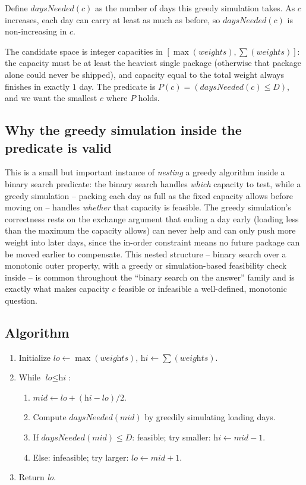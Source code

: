 Define $\textit{daysNeeded}(c)$ as the number of days this greedy
simulation takes. As $c$ increases, each day can carry at least as much as
before, so $\textit{daysNeeded}(c)$ is non-increasing in $c$.

\begin{ideabox}
The candidate space is integer capacities in
$[\max(\textit{weights}), \sum(\textit{weights})]$: the capacity must be
at least the heaviest single package (otherwise that package alone could
never be shipped), and capacity equal to the total weight always finishes
in exactly $1$ day. The predicate is
$P(c) = (\textit{daysNeeded}(c) \le D)$, and we want the smallest $c$
where $P$ holds.
\end{ideabox}

\subsection*{Why the greedy simulation inside the predicate is valid}

This is a small but important instance of \emph{nesting} a greedy
algorithm inside a binary search predicate: the binary search handles
\emph{which} capacity to test, while a greedy simulation -- packing each
day as full as the fixed capacity allows before moving on -- handles
\emph{whether} that capacity is feasible. The greedy simulation's
correctness rests on the exchange argument that ending a day early
(loading less than the maximum the capacity allows) can never help and can
only push more weight into later days, since the in-order constraint means
no future package can be moved earlier to compensate. This nested
structure -- binary search over a monotonic outer property, with a greedy
or simulation-based feasibility check inside -- is common throughout the
``binary search on the answer'' family and is exactly what makes capacity
$c$ feasible or infeasible a well-defined, monotonic question.

\subsection*{Algorithm}

\begin{enumerate}
  \item Initialize $\textit{lo} \gets \max(\textit{weights})$,
        $\textit{hi} \gets \sum(\textit{weights})$.
  \item While $\textit{lo} \le \textit{hi}$:
  \begin{enumerate}
    \item $\textit{mid} \gets \textit{lo}+(\textit{hi}-\textit{lo})/2$.
    \item Compute $\textit{daysNeeded}(\textit{mid})$ by greedily
          simulating loading days.
    \item If $\textit{daysNeeded}(\textit{mid}) \le D$: feasible; try
          smaller: $\textit{hi} \gets \textit{mid}-1$.
    \item Else: infeasible; try larger: $\textit{lo} \gets \textit{mid}+1$.
  \end{enumerate}
  \item Return \textit{lo}.
\end{enumerate}

